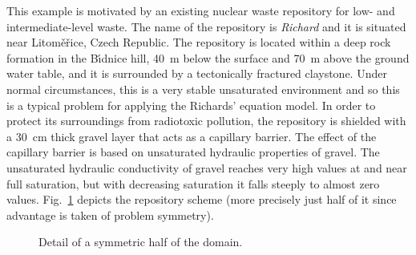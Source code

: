 \documentclass[final,3p,times,twocolumn]{elsarticle}
\begin{document}
This example is motivated by an existing nuclear waste repository for 
low- and intermediate-level waste. The name of the repository is {\em Richard} and it is situated %
near Litom\v e\v rice, Czech Republic. The repository is located within a deep 
rock formation in the B{\'\i}dnice hill, 40~m below the surface and 70~m above 
the ground water table, and it is  surrounded by a tectonically fractured 
claystone. Under normal circumstances, this is a very stable unsaturated environment 
and so this is a typical problem for applying the Richards' equation model. 
In order to protect its surroundings from radiotoxic pollution, the repository is shielded 
with a 30~cm thick gravel layer that acts as a capillary barrier.  
The effect of the capillary barrier is based on unsaturated hydraulic properties of gravel.
The unsaturated hydraulic conductivity of gravel reaches very high values 
at and near full saturation, but with decreasing saturation it falls steeply 
to almost zero values. Fig.~\ref{fig:cap-barrier-domain} depicts the repository 
scheme (more precisely just half of it since advantage is taken of
problem symmetry).

\begin{figure}[htb!]
    \begin{center} 
    \end{center}
        \caption{Detail of a symmetric half of the domain.}
      \label{fig:cap-barrier-domain}
\end{figure}
\end{document}
